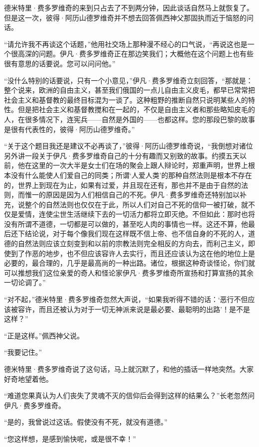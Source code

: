 \par 德米特里·费多罗维奇的来到只占去了不到两分钟，因此谈话自然马上就恢复了。但是这一次，彼得·阿历山德罗维奇并不想去回答佩西神父那固执而近于恼怒的问话。
\par “请允许我不再谈这个话题，”他用社交场上那种漫不经心的口气说，“再说这也是一个很高深的问题。伊凡·费多罗维奇正在那边笑我们；大概他在这个问题上也有些很有意思的话要说。您可以问问他。”
\par “没什么特别的话要说，只有一个小意见，”伊凡·费多罗维奇立刻回答，“那就是：整个说来，欧洲的自由主义，甚至我们俄国的一点儿自由主义皮毛，都早已常常把社会主义和基督教的最终目标混为一谈了。这种粗野的推断自然只说明某些人的特性。但是把社会主义和基督教搅和在一起的，不仅是自由主义者和那些略知皮毛的人，在很多情况下，连宪兵——自然是外国的——也都这样。您的那段巴黎的故事是很有代表性的，彼得·阿历山德罗维奇。”
\par “关于这个题目我还是建议不必再谈了，”彼得·阿历山德罗维奇说，“我倒想对诸位另外讲一段关于伊凡·费多罗维奇自己的十分有趣而又别致的故事。约摸五天以前，他在这里的一次大半是女士们在场的聚会上跟人辩论时，郑重声明，世界上根本没有什么能使人们爱自己的同类；所谓‘人爱人类’的那种自然法则是根本不存在的，世界上到现在为止，如果有过爱，并且现在还有，那也并不是由于自然的法则，而惟一的原因是因为人们相信自己的不死。伊凡·费多罗维奇还特别加以补充，说整个的自然法则也仅仅在于此，所以人们对自己不死的信仰一被打破，就不仅是爱情，连使尘世生活继续下去的一切活力都将立即灭绝。不但如此：那时也将没有所谓不道德，一切都是可以做的，甚至吃人肉的事情也一样。这还不算，他最后还下结论说，对于每个像我们现在这样既不信上帝、也不信自身的不死的人，道德的自然法则应该立刻变到和以前的宗教法则完全相反的方向去，而利己主义，即使到了作恶的地步，也不但应该容许人去实行，而且还应该认为这在他的地位上是必要的，最合理的，几乎是最高尚的一种出路。诸位，根据这种奇谈怪论，你们就可以推想我们这位亲爱的奇人和怪论家伊凡·费多罗维奇所宣扬和打算宣扬的其余一切论调了。”
\par “对不起，”德米特里·费多罗维奇忽然大声说，“如果我听得不错的话：‘恶行不但应该被容许，而且还被认为对于一切无神派来说是最必要、最聪明的出路’！是不是这样？”
\par “正是这样。”佩西神父说。
\par “我要记住。”
\par 德米特里·费多罗维奇说了这句话，马上就沉默了，和他的插话一样地突然。大家好奇地望着他。
\par “难道您果真认为人们丧失了灵魂不灭的信仰后会得到这样的结果么？”长老忽然问伊凡·费多罗维奇。
\par “是的，我曾说过这话。假使没有不死，就没有道德。”
\par “您这样想，是感到愉快呢，或是很不幸！”
